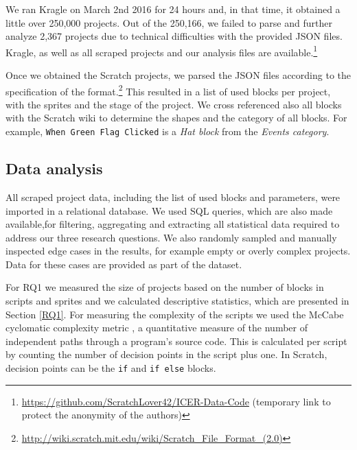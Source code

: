\documentclass{sig-alternate}
\newcommand{\nPrograms}{250,166}
\begin{document}

We ran Kragle on March 2nd 2016 for 24 hours and, in that time, it obtained a little over 250,000 projects. Out of the \nPrograms, we failed to parse and further analyze 2,367 projects due to technical difficulties with the provided JSON files. Kragle, as well as all scraped projects and our analysis files are available.\footnote{\label{repo}\url{https://github.com/ScratchLover42/ICER-Data-Code} (temporary link to protect the anonymity of the authors)}

Once we obtained the Scratch projects, we parsed the JSON files according to the specification of the format.\footnote{\url{http://wiki.scratch.mit.edu/wiki/Scratch_File_Format_(2.0)}} This resulted in a list of used blocks per project, with the sprites and the stage of the project. We cross referenced also all blocks with the Scratch wiki to determine the shapes and the category of all blocks. For example, \texttt{When Green Flag Clicked} is a \emph{Hat block} from the \emph{Events category}.

\subsection{Data analysis}
\label{dataAnalysis}
All scraped project data, including the list of used blocks and parameters, were imported in a relational database. We used SQL queries, which are also made available,\footnotemark[\ref{repo}] for filtering, aggregating and extracting all statistical data required to address our three research questions. We also randomly sampled and manually inspected edge cases in the results, for example empty or overly complex projects. Data for these cases are provided as part of the dataset.\footnotemark[\ref{repo}]

For RQ1 we measured the size of projects based on the number of blocks in scripts and sprites and we calculated descriptive statistics, which are presented in Section \ref{RQ1}. For measuring the complexity of the scripts we used the McCabe cyclomatic complexity metric \cite{mcCabe76}, a quantitative measure of the number of independent paths through a program's source code. This is calculated per script by counting the number of decision points in the script plus one. In Scratch, decision points can be the \texttt{if} and \texttt{if else} blocks.
\end{document}
